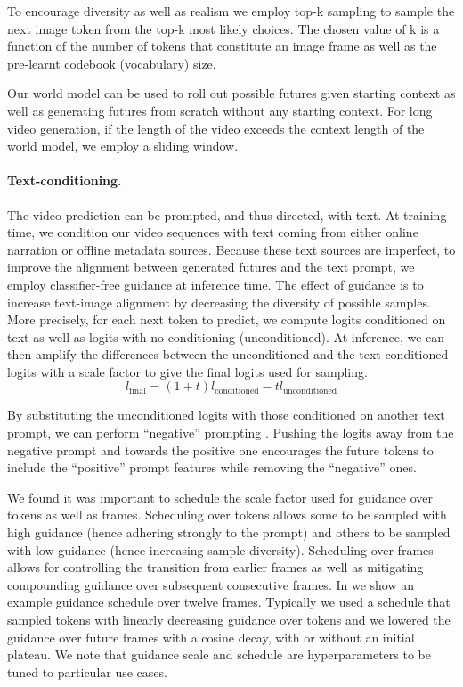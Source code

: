 To encourage diversity as well as realism we employ top-k sampling to sample the next image token from the top-k most likely choices. The chosen value of k is a function of the number of tokens that constitute an image frame as well as the pre-learnt codebook (vocabulary) size.

Our world model can be used to roll out possible futures given starting context as well as generating futures from scratch without any starting context. For long video generation, if the length of the video exceeds the context length of the world model, we employ a sliding window.

\paragraph{Text-conditioning.}The video prediction can be prompted, and thus directed, with text. At training time, we condition our video sequences with text coming from either online narration or offline metadata sources. Because these text sources are imperfect, to improve the alignment between generated futures and the text prompt, we employ classifier-free guidance \citep{ho2022classifier, chang2023muse} at inference time. The effect of guidance is to increase text-image alignment by decreasing the diversity of possible samples. More precisely, for each next token to predict, we compute logits conditioned on text as well as logits with no conditioning (unconditioned). At inference, we can then amplify the differences between the unconditioned and the text-conditioned logits with a scale factor to give the final logits used for sampling.
\begin{equation}
\label{eq:classifier-free-guidance}
l_{\text{final}} = (1 + t)l_{\text{conditioned}} - tl_{\text{unconditioned}}
\end{equation}

By substituting the unconditioned logits with those conditioned on another text prompt, we can perform ``negative'' prompting \citep{negprompt2022}. Pushing the logits away from the negative prompt and towards the positive one encourages the future tokens to include the ``positive'' prompt features while removing the ``negative'' ones.

We found it was important to schedule the scale factor used for guidance over tokens as well as frames. Scheduling over tokens allows some to be sampled with high guidance (hence adhering strongly to the prompt) and others to be sampled with low guidance (hence increasing sample diversity). Scheduling over frames allows for controlling the transition from earlier frames as well as mitigating compounding guidance over subsequent consecutive frames. In  we show an example guidance schedule over twelve frames. Typically we used a schedule that sampled tokens with linearly decreasing guidance over tokens and we lowered the guidance over future frames with a cosine decay, with or without an initial plateau. We note that guidance scale and schedule are hyperparameters to be tuned to particular use cases. 


